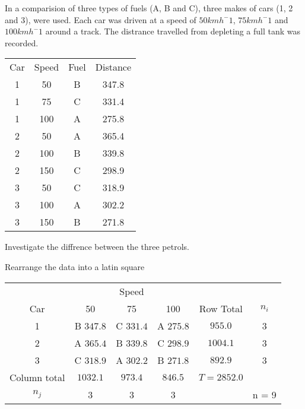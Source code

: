         \begin{example}
        {
            In a comparision of three types of fuels (A, B and C), three makes of cars (1, 2 and 3), were used. Each car was driven at a speed of $50 km h^-1$, $75 km h^-1$ and $100 km h^-1$ around a track. The distrance travelled from depleting a full tank was recorded.
        
            \begin{center}
            \begin{tabular}{c|c|c|c}
            Car & Speed & Fuel  & Distance  \\
            1   & 50    & B     & 347.8     \\
            1   & 75    & C     & 331.4     \\
            1   & 100   & A     & 275.8     \\
            2   & 50    & A     & 365.4     \\
            2   & 100   & B     & 339.8     \\
            2   & 150   & C     & 298.9     \\
            3   & 50    & C     & 318.9     \\
            3   & 100   & A     & 302.2     \\
            3   & 150   & B     & 271.8     \\
            \end{tabular}
            \end{center}

            Investigate the diffrence between the three petrols.
        }

        \begin{step}{Rearrange the data into a latin square}
        \begin{center}
        \begin{tabular}{c|ccc|c|c}
                        & \multicolumn{3}{c}{Speed}         &           &           \\
        Car             & 50        & 75        & 100       & Row Total & $n_i$     \\
        \hline
        1               & B $347.8$ & C $331.4$ & A $275.8$ & $955.0$       & 3     \\
        2               & A $365.4$ & B $339.8$ & C $298.9$ & $1004.1$      & 3     \\
        3               & C $318.9$ & A $302.2$ & B $271.8$ & $892.9$       & 3     \\
        \hline
        Column total    & $1032.1$  & $973.4$   & $846.5$   & $T = 2852.0$  &       \\
        \hline
        $n_j$           & 3         & 3         & 3         &               & n = 9 \\
        \end{tabular}
        \end{center}


\end{step}
\end{example}
